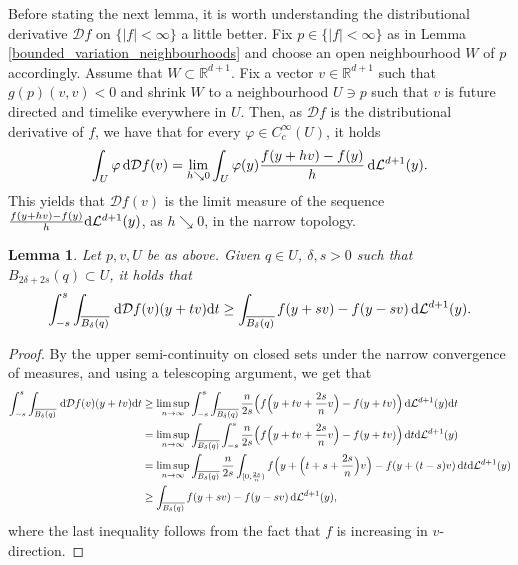 \documentclass[a4paper,10pt]{article}
\newtheorem{lemma}[theorem]{Lemma}
\numberwithin{equation}{section}
\newcommand{\R}{\mathbb{R}}
\newcommand{\p}{\varphi}
\newcommand{\di}{{\rm d}}
\begin{document}
Before stating the next lemma, it is worth understanding the distributional derivative $\mathcal{D}f$ on $\{|f|<\infty\}$ a little better. Fix $p \in \{|f|<\infty\}$ as in Lemma \ref{bounded_variation_neighbourhoods} and choose an open neighbourhood $W$ of $p$ accordingly. Assume that $W \subset \R^{d+1}$. Fix a vector $v \in \R^{d+1}$ such that $g(p)(v,v)<0$ and shrink $W$ to a neighbourhood $U \ni p$ such that $v$ is future directed and timelike everywhere in $U$. Then, as $\mathcal{D}f$ is the distributional derivative of $f$, we have that for every $\varphi \in C_c^\infty(U)$, it holds
\begin{align*}
    \int_U \varphi \, \di \mathcal{D}f(v) = \lim_{h \searrow 0} \int_U \p(y) \frac{f(y+hv)-f(y)}{h} \, \di \mathcal{L}^{d+1}(y).
\end{align*}
This yields that $\mathcal{D}f(v)$ is the limit measure of the sequence $\frac{f(y+hv)-f(y)}{h} \di \mathcal{L}^{d+1}(y)$, as $h \searrow 0$, in the narrow topology.

\smallskip

\begin{lemma}\label{fundamental_thm_of_calculus_for_measure}
    Let $p, v, U$ be as above.
    Given $q \in U$, $\delta, s >0$ such that $B_{2\delta+2s}(q) \subset U$, it holds that 
    \begin{align*}
        \int_{-s}^s \int_{\overline{B_\delta(q)}} \, \di\mathcal{D}f(v)(y+ tv) \di t \geq \int_{\overline{B_\delta(q)}} f(y+sv)-f(y-sv)\, \di \mathcal{L}^{d+1}(y).
    \end{align*}
\end{lemma}
\begin{proof}
    By the upper semi-continuity on closed sets under the narrow convergence of measures, and using a telescoping argument, we get that 
    \begin{align*}
        \int_{-s}^s \int_{\overline{B_\delta(q)}} \, \di\mathcal{D}f(v)(y+ tv) \di t &\geq \limsup_{n \to \infty} \int_{-s}^s \int_{\overline{B_\delta(q)}} \frac{n}{2s}\Big(f\Big(y+tv+\frac{2s}{n}v\Big)-f(y+tv)\Big)\, \di \mathcal{L}^{d+1}(y) \di t \\
        &= \limsup_{n \to \infty}  \int_{\overline{B_\delta(q)}} \int_{-s}^s \frac{n}{2s}\Big(f\Big(y+tv+\frac{2s}{n}v\Big)-f(y+tv)\Big) \, \di t\di \mathcal{L}^{d+1}(y) \\
        & = \limsup_{n \to \infty}  \int_{\overline{B_\delta(q)}} \frac{n}{2s}\int_{[0, \frac{2s}{n})}  f\Big(y+\Big(t+s+\frac{2s}{n}\Big)v\Big)-f(y+(t-s)v) \, \di t\di \mathcal{L}^{d+1}(y)\\
        & \geq  \int_{\overline{B_\delta(q)}} f(y+sv)-f(y-sv) \, \di \mathcal{L}^{d+1}(y),
    \end{align*}
    where the last inequality follows from the fact that $f$ is increasing in $v$-direction.
\end{proof}
\end{document}
